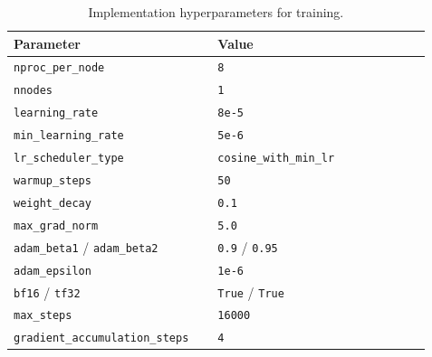 \begin{table}[t]
\centering
\small
\caption{Implementation hyperparameters for training.}
\label{tab:impl_hparams}
\begin{tabular}{p{0.45\linewidth}p{0.47\linewidth}}
\toprule
\textbf{Parameter} & \textbf{Value} \\
\midrule
\texttt{nproc\_per\_node} & \texttt{8} \\
\texttt{nnodes} & \texttt{1} \\
\texttt{learning\_rate} & \texttt{8e-5} \\
\texttt{min\_learning\_rate} & \texttt{5e-6} \\
\texttt{lr\_scheduler\_type} & \texttt{cosine\_with\_min\_lr} \\
\texttt{warmup\_steps} & \texttt{50} \\
\texttt{weight\_decay} & \texttt{0.1} \\
\texttt{max\_grad\_norm} & \texttt{5.0} \\
\texttt{adam\_beta1} / \texttt{adam\_beta2} & \texttt{0.9} / \texttt{0.95} \\
\texttt{adam\_epsilon} & \texttt{1e-6} \\
\texttt{bf16} / \texttt{tf32} & \texttt{True} / \texttt{True} \\
\texttt{max\_steps} & \texttt{16000} \\
\texttt{gradient\_accumulation\_steps} & \texttt{4} \\

\end{tabular}
\end{table}
